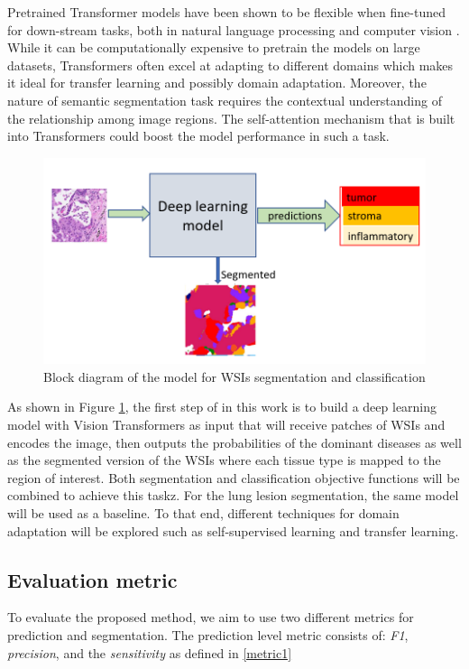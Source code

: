 \documentclass[final]{cvpr}
\begin{document}
Pretrained Transformer models have been shown to be flexible when fine-tuned for down-stream tasks, both in natural language processing and computer vision \cite{devlin2019bert,radford2019language}. While it can be computationally expensive to pretrain the models on large datasets, Transformers often excel at adapting to different domains which makes it ideal for transfer learning and possibly domain adaptation. Moreover, the nature of semantic segmentation task requires the contextual understanding of the relationship among image regions. The self-attention mechanism that is built into Transformers could boost the model performance in such a task.

\begin{figure}[h!]
\begin{center}
   \includegraphics[width=0.8\linewidth]{media/roi1.PNG}
\end{center}
   \caption{Block diagram of the model for WSIs segmentation and classification}
\label{fig:roi}
\end{figure}

As shown in Figure \ref{fig:roi}, the first step of in this work is to build a deep learning model with Vision Transformers as input that will receive patches of WSIs and encodes the image, then outputs the probabilities of the dominant diseases as well as the segmented version of the WSIs where each tissue type is mapped to the region of interest. Both segmentation and classification objective functions will be combined to achieve this taskz. For the lung lesion segmentation, the same model will be used as a baseline. To that end, different techniques for domain adaptation will be explored such as self-supervised learning and transfer learning.

\subsection{Evaluation metric}
To evaluate the proposed method, we aim to use two different metrics for prediction and segmentation. The prediction level metric consists of: \textit{F1}, \textit{precision}, and the \textit{sensitivity} as defined in \ref{metric1}
\end{document}
